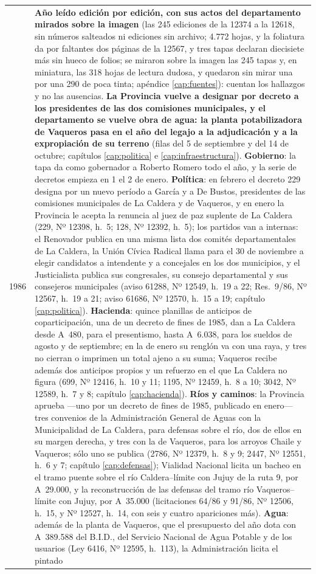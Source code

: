 \begin{longtable}{@{}p{2.7cm}p{10.3cm}@{}}
1986 & \textbf{Año leído edición por edición, con sus actos del departamento mirados sobre la imagen} (las 245 ediciones de la 12374 a la 12618, sin números salteados ni ediciones sin archivo; 4.772 hojas, y la foliatura da por faltantes dos páginas de la 12567, y tres tapas declaran diecisiete más sin hueco de folios; se miraron sobre la imagen las 245 tapas y, en miniatura, las 318 hojas de lectura dudosa, y quedaron sin mirar una por una 290 de poca tinta; apéndice \ref{cap:fuentes}): cuentan los hallazgos y no las ausencias. \textbf{La Provincia vuelve a designar por decreto a los presidentes de las dos comisiones municipales, y el departamento se vuelve obra de agua: la planta potabilizadora de Vaqueros pasa en el año del legajo a la adjudicación y a la expropiación de su terreno} (filas del 5 de septiembre y del 14 de octubre; capítulos \ref{cap:politica} e \ref{cap:infraestructura}). \textbf{Gobierno}: la tapa da como gobernador a Roberto Romero todo el año, y la serie de decretos empieza en 1 el 2 de enero. \textbf{Política}: en febrero el decreto 229 designa por un nuevo período a García y a De Bustos, presidentes de las comisiones municipales de La Caldera y de Vaqueros, y en enero la Provincia le acepta la renuncia al juez de paz suplente de La Caldera (229, Nº 12398, h.\ 5; 128, Nº 12392, h.\ 5); los partidos van a internas: el Renovador publica en una misma lista dos comités departamentales de La Caldera, la Unión Cívica Radical llama para el 30 de noviembre a elegir candidatos a intendente y a concejales en los dos municipios, y el Justicialista publica sus congresales, su consejo departamental y sus consejeros municipales (aviso 61288, Nº 12549, h.\ 19 a 22; Res.\ 9/86, Nº 12567, h.\ 19 a 21; aviso 61686, Nº 12570, h.\ 15 a 19; capítulo \ref{cap:politica}). \textbf{Hacienda}: quince planillas de anticipos de coparticipación, una de un decreto de fines de 1985, dan a La Caldera desde A~480, para el presentismo, hasta A~6.038, para los sueldos de agosto y de septiembre; en la de enero su renglón va con una raya, y tres no cierran o imprimen un total ajeno a su suma; Vaqueros recibe además dos anticipos propios y un refuerzo en el que La Caldera no figura (699, Nº 12416, h.\ 10 y 11; 1195, Nº 12459, h.\ 8 a 10; 3042, Nº 12589, h.\ 7 y 8; capítulo \ref{cap:hacienda}). \textbf{Ríos y caminos}: la Provincia aprueba ---uno por un decreto de fines de 1985, publicado en enero--- tres convenios de la Administración General de Aguas con la Municipalidad de La Caldera, para defensas sobre el río, dos de ellos en su margen derecha, y tres con la de Vaqueros, para los arroyos Chaile y Vaqueros; sólo uno se publica (2786, Nº 12379, h.\ 8 y 9; 2447, Nº 12551, h.\ 6 y 7; capítulo \ref{cap:defensas}); Vialidad Nacional licita un bacheo en el tramo puente sobre el río Caldera--límite con Jujuy de la ruta 9, por A~29.000, y la reconstrucción de las defensas del tramo río Vaqueros--límite con Jujuy, por A~35.000 (licitaciones 64/86 y 91/86, Nº 12506, h.\ 15, y Nº 12527, h.\ 14, con seis y cuatro apariciones más). \textbf{Agua}: además de la planta de Vaqueros, que el presupuesto del año dota con A~389.588 del B.I.D., del Servicio Nacional de Agua Potable y de los usuarios (Ley 6416, Nº 12595, h.\ 113), la Administración licita el pintado 
\end{longtable}
